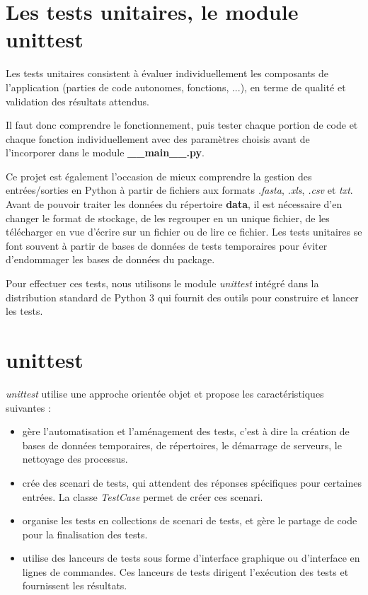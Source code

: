 \documentclass[twoside,a4paper,11pt,frenchb,openany]{report}
\begin{document}
\section{Les tests unitaires, le module unittest}

Les tests unitaires consistent à évaluer individuellement les composants de l'application (parties de code autonomes, fonctions, ...), en terme de qualité et validation des résultats attendus.

Il faut donc comprendre le fonctionnement, puis tester chaque portion de code et chaque fonction individuellement avec des paramètres choisis avant de l'incorporer dans le module \textbf{\_\_main\_\_.py}. 

Ce projet est également l'occasion de mieux comprendre la gestion des entrées/sorties en Python à partir de fichiers aux formats \textit{.fasta}, \textit{.xls}, \textit{.csv} et \textit{txt}. Avant de pouvoir traiter les données du répertoire \textbf{data}, il est nécessaire d'en changer le format de stockage, de les regrouper en un unique fichier, de les télécharger en vue d'écrire sur un fichier ou de lire ce fichier. Les tests unitaires se font souvent à partir de bases de données de tests temporaires pour éviter d'endommager les bases de données du package. 

Pour effectuer ces tests, nous utilisons le module \textit{unittest} intégré dans la distribution standard de Python 3 qui fournit des outils pour construire et lancer les tests.





\section{unittest}

\textit{unittest} utilise une approche orientée objet et propose les caractéristiques suivantes :

\begin{itemize}
\item gère l'automatisation et l'aménagement des tests, c'est à dire la création de bases de données temporaires, de répertoires, le démarrage de serveurs, le nettoyage des processus.
\item crée des scenari de tests, qui attendent des réponses spécifiques pour certaines entrées. La classe \textit{TestCase} permet de créer ces scenari.
\item organise les tests en collections de scenari de tests, et gère le partage de code pour la finalisation des tests.
\item utilise des lanceurs de tests sous forme d'interface graphique ou d'interface en lignes de commandes. Ces lanceurs de tests dirigent l'exécution des tests et fournissent les résultats.
\end{itemize}
\end{document}
